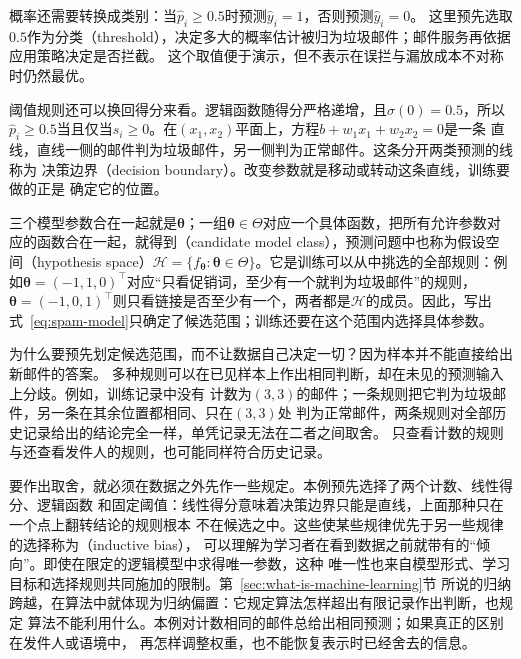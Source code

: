 概率还需要转换成类别：当$\hat{p}_i\geq 0.5$时预测$\hat{y}_i=1$，否则预测$\hat{y}_i=0$。
这里预先选取$0.5$作为分类（threshold），决定多大的概率估计被归为垃圾邮件；邮件服务再依据应用策略决定是否拦截。
这个取值便于演示，但不表示在误拦与漏放成本不对称时仍然最优。

阈值规则还可以换回得分来看。逻辑函数随得分严格递增，且$\sigma(0)=0.5$，所以
$\hat{p}_i\geq 0.5$当且仅当$s_i\geq 0$。在$(x_1,x_2)$平面上，方程$b+w_1x_1+w_2x_2=0$是一条
直线，直线一侧的邮件判为垃圾邮件，另一侧判为正常邮件。这条分开两类预测的线称为
决策边界（decision boundary）。改变参数就是移动或转动这条直线，训练要做的正是
确定它的位置。

三个模型参数合在一起就是$\bm{\theta}$；一组$\bm{\theta}\in\Theta$对应一个具体函数，把所有允许参数对应的函数合在一起，就得到（candidate model class），预测问题中也称为假设空间（hypothesis space）$\mathcal{H}=\{f_{\bm{\theta}}:\bm{\theta}\in\Theta\}$。它是训练可以从中挑选的全部规则：例如$\bm{\theta}=(-1,1,0)^{\top}$对应“只看促销词，至少有一个就判为垃圾邮件”的规则，$\bm{\theta}=(-1,0,1)^{\top}$则只看链接是否至少有一个，两者都是$\mathcal{H}$的成员。因此，写出式~\eqref{eq:spam-model}只确定了候选范围；训练还要在这个范围内选择具体参数。

为什么要预先划定候选范围，而不让数据自己决定一切？因为样本并不能直接给出新邮件的答案。
多种规则可以在已见样本上作出相同判断，却在未见的预测输入上分歧。例如，训练记录中没有
计数为$(3,3)$的邮件；一条规则把它判为垃圾邮件，另一条在其余位置都相同、只在$(3,3)$处
判为正常邮件，两条规则对全部历史记录给出的结论完全一样，单凭记录无法在二者之间取舍。
只查看计数的规则与还查看发件人的规则，也可能同样符合历史记录。

要作出取舍，就必须在数据之外先作一些规定。本例预先选择了两个计数、线性得分、逻辑函数
和固定阈值：线性得分意味着决策边界只能是直线，上面那种只在一个点上翻转结论的规则根本
不在候选之中。这些使某些规律优先于另一些规律的选择称为（inductive bias），
可以理解为学习者在看到数据之前就带有的“倾向”。即使在限定的逻辑模型中求得唯一参数，这种
唯一性也来自模型形式、学习目标和选择规则共同施加的限制。第~\ref{sec:what-is-machine-learning}节
所说的归纳跨越，在算法中就体现为归纳偏置：它规定算法怎样超出有限记录作出判断，也规定
算法不能利用什么。本例对计数相同的邮件总给出相同预测；如果真正的区别在发件人或语境中，
再怎样调整权重，也不能恢复表示时已经舍去的信息。

